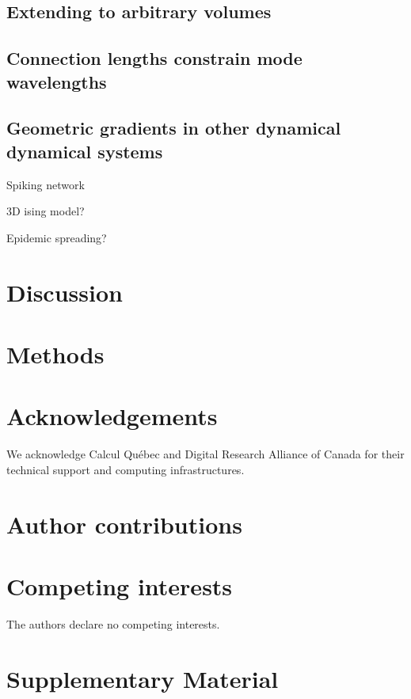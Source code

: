 \documentclass{article}
\begin{document}
\begin{multicols}{2}

\subsection*{Extending to arbitrary volumes}

\subsection*{Connection lengths constrain mode wavelengths}

\subsection*{Geometric gradients in other dynamical dynamical systems}

Spiking network

3D ising model?

Epidemic spreading?




\section*{Discussion}


\section*{Methods}


\newpage




\section*{Acknowledgements}

We acknowledge Calcul Québec and Digital Research Alliance of Canada for their technical support and computing infrastructures.

\section*{Author contributions}

\section*{Competing interests}

The authors declare no competing interests.

\end{multicols}

\newpage

\section*{Supplementary Material}
\end{document}
